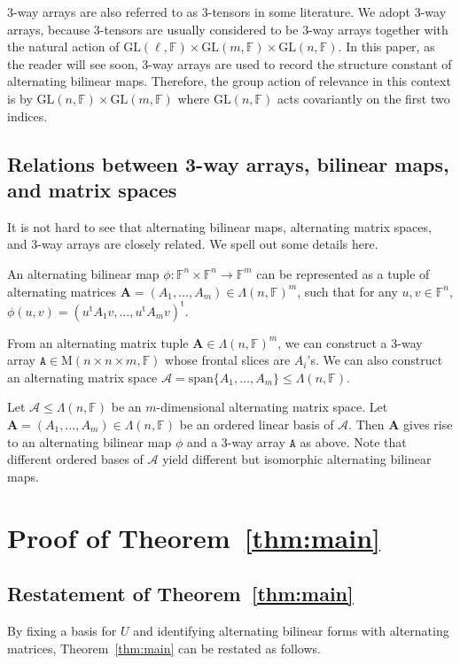 \documentclass[10pt]{article}
\newcommand{\tens}[1]{\mathtt{#1}}
\newcommand{\spa}[1]{\mathcal{#1}}
\newcommand{\GL}{\mathrm{GL}}
\newcommand{\F}{\mathbb{F}}
\newcommand{\M}{\mathrm{M}}
\renewcommand{\span}{\mathrm{span}}
\newcommand{\cA}{\spa{A}}
\newcommand{\tA}{\tens{A}}
\newcommand{\bA}{\mathbf{A}}
\newcommand{\tr}[1]{#1^{\mathrm{t}}}
\begin{document}
3-way arrays are also referred to as 3-tensors in 
some literature. We adopt 3-way arrays, because 3-tensors are usually considered 
to be $3$-way arrays together with 
the natural action of $\GL(\ell, \F)\times\GL(m, \F)\times\GL(n, \F)$. In this 
paper, as the reader will see soon, 3-way arrays are used to record the structure 
constant of alternating 
bilinear maps. Therefore, the group action of relevance in this context is by 
$\GL(n, \F)\times 
\GL(m, \F)$ 
where $\GL(n, \F)$ acts covariantly on the first two indices. 
%
%

\subsection{Relations between 3-way arrays, bilinear maps, and matrix spaces} 
\label{subsec:rel}
It is not hard to see that alternating bilinear maps, alternating matrix spaces, 
and 3-way arrays are closely related. We spell out some details here.

An alternating bilinear map 
$\phi:\F^n\times 
\F^n\to 
\F^m$ can be represented as a tuple of alternating matrices 
$\bA=(A_1, \dots, A_m)\in\Lambda(n, \F)^m$, such that for any $u, v\in \F^n$, 
$\phi(u, v)=\tr{(\tr{u}A_1v, \dots, \tr{u}A_mv)}$.

From an alternating matrix tuple $\bA\in\Lambda(n, \F)^m$, we can construct a 
$3$-way array $\tA\in\M(n\times n\times m, \F)$ whose frontal slices are $A_i$'s. 
We can also construct an alternating matrix space $\cA=\span\{A_1, \dots, 
A_m\}\leq\Lambda(n, \F)$. 

Let $\cA\leq\Lambda(n, \F)$ be an $m$-dimensional alternating matrix space. Let
$\bA=(A_1, \dots, A_m)\in\Lambda(n, \F)$ be an ordered linear basis of $\cA$. Then 
$\bA$ gives rise to an alternating bilinear map $\phi$ and a 3-way array $\tA$ as 
above. Note that different ordered bases of $\cA$ yield different but isomorphic
alternating bilinear maps.

\section{Proof of Theorem~\ref{thm:main}}\label{sec:thm_proof}

%
%

\subsection{Restatement of Theorem~\ref{thm:main}} By fixing a basis for $U$ and 
identifying alternating bilinear forms with alternating matrices, 
Theorem~\ref{thm:main} can be restated as follows. 
\end{document}
